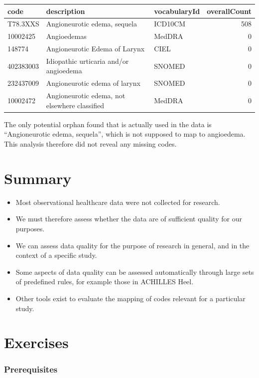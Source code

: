 \documentclass[11pt]{book}
\theoremstyle{definition}
\theoremstyle{definition}
\theoremstyle{definition}
\theoremstyle{remark}
\let\BeginKnitrBlock\begin \let\EndKnitrBlock\end
\begin{document}
\begin{longtable}[]{@{}lllr@{}}
\toprule
code & description & vocabularyId & overallCount\tabularnewline
\midrule
\endhead
T78.3XXS & Angioneurotic edema, sequela & ICD10CM & 508\tabularnewline
10002425 & Angioedemas & MedDRA & 0\tabularnewline
148774 & Angioneurotic Edema of Larynx & CIEL & 0\tabularnewline
402383003 & Idiopathic urticaria and/or angioedema & SNOMED & 0\tabularnewline
232437009 & Angioneurotic edema of larynx & SNOMED & 0\tabularnewline
10002472 & Angioneurotic edema, not elsewhere classified & MedDRA & 0\tabularnewline
\bottomrule
\end{longtable}

The only potential orphan found that is actually used in the data is ``Angioneurotic edema, sequela'', which is not supposed to map to angioedema. This analysis therefore did not reveal any missing codes.

\hypertarget{summary-11}{%
\section{Summary}\label{summary-11}}

\BeginKnitrBlock{rmdsummary}
\begin{itemize}
\item
  Most observational healthcare data were not collected for research.
\item
  We must therefore assess whether the data are of sufficient quality for our purposes.
\item
  We can assess data quality for the purpose of research in general, and in the context of a specific study.
\item
  Some aspects of data quality can be assessed automatically through large sets of predefined rules, for example those in ACHILLES Heel.
\item
  Other tools exist to evaluate the mapping of codes relevant for a particular study.
\end{itemize}
\EndKnitrBlock{rmdsummary}

\hypertarget{exercises-4}{%
\section{Exercises}\label{exercises-4}}

\hypertarget{prerequisites-2}{%
\subsubsection*{Prerequisites}\label{prerequisites-2}}
\end{document}
